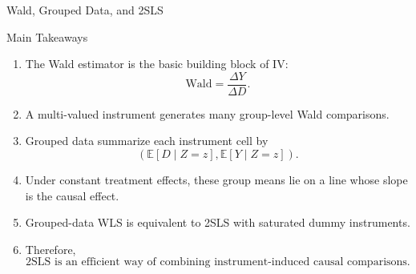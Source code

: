 \documentclass[aspectratio=169]{beamer}
\newcommand{\E}{\mathbb{E}}
\begin{document}
\begin{frame}{Wald, Grouped Data, and 2SLS}

\begin{center}
\end{center}

\end{frame}

\begin{frame}{Main Takeaways}

\begin{enumerate}
    \item The Wald estimator is the basic building block of IV:
    \[
    \boxed{\text{Wald}=\frac{\Delta Y}{\Delta D}.}
    \]

    \item A multi-valued instrument generates many group-level Wald comparisons.

    \item Grouped data summarize each instrument cell by
    \[
    \left(
    \E[D\mid Z=z],
    \E[Y\mid Z=z]
    \right).
    \]

    \item Under constant treatment effects, these group means lie on a line whose slope is the causal effect.

    \item Grouped-data WLS is equivalent to 2SLS with saturated dummy instruments.

    \item Therefore,
    \[
    \boxed{
    \text{2SLS is an efficient way of combining instrument-induced causal comparisons.}
    }
    \]
\end{enumerate}

\end{frame}
\end{document}
